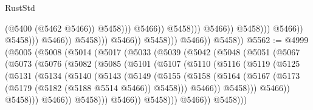 \begin{lexlean}{RustStd}
\begin{coremodule}
                                                                    (@5400 (@5462 @5466))
                                                                    @5458)))
                                                              @5466))
                                                          @5458)))
                                                    @5466))
                                                @5458)))
                                          @5466))
                                      @5458)))
                                @5466))
                            @5458)))
                      @5466))
                  @5458)))
            @5466))
        @5458))
@5562 := @4999
    (@5005
      (@5008
        (@5014
          (@5017
            (@5033
              (@5039
                (@5042
                  (@5048
                    (@5051
                      (@5067
                        (@5073
                          (@5076
                            (@5082
                              (@5085
                                (@5101
                                  (@5107
                                    (@5110
                                      (@5116
                                        (@5119
                                          (@5125
                                            (@5131
                                              (@5134
                                                (@5140
                                                  (@5143
                                                    (@5149
                                                      (@5155
                                                        (@5158
                                                          (@5164
                                                            (@5167
                                                              (@5173
                                                                (@5179
                                                                  (@5182 (@5188 @5514 @5466))
                                                                  @5458)))
                                                            @5466))
                                                        @5458)))
                                                  @5466))
                                              @5458)))
                                        @5466))
                                    @5458)))
                              @5466))
                          @5458)))
                    @5466))
                @5458)))

\end{coremodule}
\end{lexlean}
